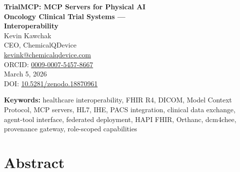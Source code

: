 \documentclass[10pt,letterpaper]{article}
\begin{document}
\begin{center}
{\LARGE\bfseries\color{headerblue} TrialMCP: MCP Servers for Physical AI\\[4pt]
Oncology Clinical Trial Systems ---\\[4pt]
Interoperability}\\[16pt]

{\large Kevin Kawchak}\\[4pt]
{\normalsize CEO, ChemicalQDevice}\\[2pt]
{\small\href{mailto:kevink@chemicalqdevice.com}{kevink@chemicalqdevice.com}}\\[2pt]
{\small ORCID: \href{https://orcid.org/0009-0007-5457-8667}{0009-0007-5457-8667}}\\[12pt]

{\normalsize March 5, 2026}\\[8pt]

{\small DOI: \href{https://doi.org/10.5281/zenodo.18870961}{10.5281/zenodo.18870961}}\\[16pt]
\end{center}

\noindent\textbf{Keywords:} healthcare interoperability, FHIR R4, DICOM, Model Context Protocol, MCP servers, HL7, IHE, PACS integration, clinical data exchange, agent-tool interface, federated deployment, HAPI FHIR, Orthanc, dcm4chee, provenance gateway, role-scoped capabilities

\vspace{12pt}

\section*{Abstract}
\end{document}
